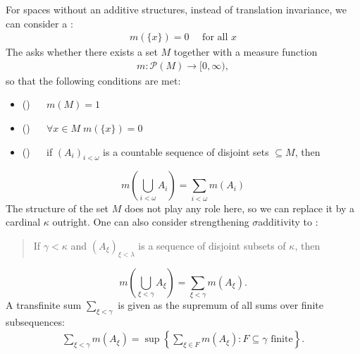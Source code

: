 \documentclass[letterpaper,10pt,english]{jupyterBook}
\begin{document}
\sphinxAtStartPar
For spaces without an additive structures, instead of translation invariance, we can consider a :
\begin{equation*}
\begin{split}
m(\{x\})=0 \quad \text{ for all $x$}
\end{split}
\end{equation*}
\sphinxAtStartPar
The  asks whether there exists a set \(M\) together with a measure function
\begin{gather*}
m: \mathcal{P}(M) \to [0,\infty),
\end{gather*}
\sphinxAtStartPar
so that the following conditions are met:
\begin{itemize}
\item {} 
\sphinxAtStartPar
() \(\quad\) \(m(M) =1\)

\item {} 
\sphinxAtStartPar
() \(\quad\) \(\forall x \in M \; m(\{x\})=0\)

\item {} 
\sphinxAtStartPar
() \(\quad\) if \((A_i)_{i < \omega}\) is a countable sequence of disjoint sets \(\subseteq M\), then

\end{itemize}
\begin{equation*}
m\left(\bigcup_{i<\omega} A_i\right ) =  \sum_{i<\omega} m(A_i)
\end{equation*}
\sphinxAtStartPar
The structure of the set \(M\) does not play any role here, so we can replace it by a cardinal \(\kappa\) outright. One can also consider strengthening \(\sigma\)\sphinxhyphen{}additivity to :
\begin{quote}

\sphinxAtStartPar
If \(\gamma < \kappa\) and  \((A_\xi)_{\xi< \lambda}\) is a sequence of disjoint subsets of \(\kappa\), then
\end{quote}
\begin{equation*}
m(\bigcup_{\xi<\gamma} A_\xi) =  \sum_{\xi<\gamma} m(A_\xi).
\end{equation*}
\sphinxAtStartPar
A transfinite sum \(\sum_{\xi<\gamma}\) is given as the supremum of all sums over finite subsequences:
\begin{equation*}
\begin{split}
\sum_{\xi<\gamma} m(A_\xi) = \sup \left \{ \sum_{\xi \in F} m(A_\xi) \colon F \subseteq \gamma \text{ finite}\right \}.
\end{split}
\end{equation*}
\end{document}
